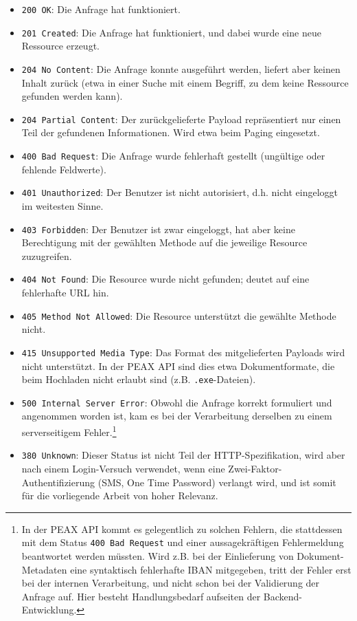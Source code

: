\begin{itemize}
	\item \texttt{200 OK}: Die Anfrage hat funktioniert.
	\item \texttt{201 Created}: Die Anfrage hat funktioniert, und dabei wurde eine neue Ressource erzeugt.
	\item \texttt{204 No Content}: Die Anfrage konnte ausgeführt werden, liefert aber keinen Inhalt zurück (etwa in einer Suche mit einem Begriff, zu dem keine Ressource gefunden werden kann).
	\item \texttt{204 Partial Content}: Der zurückgelieferte Payload repräsentiert nur einen Teil der gefundenen Informationen. Wird etwa beim Paging eingesetzt.
	\item \texttt{400 Bad Request}: Die Anfrage wurde fehlerhaft gestellt (ungültige oder fehlende Feldwerte).
	\item \texttt{401 Unauthorized}: Der Benutzer ist nicht autorisiert, d.h. nicht eingeloggt im weitesten Sinne.
	\item \texttt{403 Forbidden}: Der Benutzer ist zwar eingeloggt, hat aber keine Berechtigung mit der gewählten Methode auf die jeweilige Resource zuzugreifen.
	\item \texttt{404 Not Found}: Die Resource wurde nicht gefunden; deutet auf eine fehlerhafte URL hin.
	\item \texttt{405 Method Not Allowed}: Die Resource unterstützt die gewählte Methode nicht.
	\item \texttt{415 Unsupported Media Type}: Das Format des mitgelieferten Payloads wird nicht unterstützt. In der PEAX API sind dies etwa Dokumentformate, die beim Hochladen nicht erlaubt sind (z.B. \texttt{.exe}-Dateien).
	\item \texttt{500 Internal Server Error}: Obwohl die Anfrage korrekt formuliert und angenommen worden ist, kam es bei der Verarbeitung derselben zu einem serverseitigem Fehler.\footnote{In der PEAX API kommt es gelegentlich zu solchen Fehlern, die stattdessen mit dem Status \texttt{400 Bad Request} und einer aussagekräftigen Fehlermeldung beantwortet werden müssten. Wird z.B. bei der Einlieferung von Dokument-Metadaten eine syntaktisch fehlerhafte IBAN mitgegeben, tritt der Fehler erst bei der internen Verarbeitung, und nicht schon bei der Validierung der Anfrage auf. Hier besteht Handlungsbedarf aufseiten der Backend-Entwicklung.}
	\item \texttt{380 Unknown}: Dieser Status ist nicht Teil der HTTP-Spezifikation, wird aber nach einem Login-Versuch verwendet, wenn eine Zwei-Faktor-Authentifizierung (SMS, One Time Password) verlangt wird, und ist somit für die vorliegende Arbeit von hoher Relevanz.
\end{itemize}

